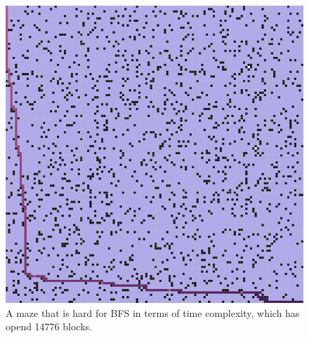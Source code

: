 \documentclass[letter]{article}
\begin{document}
\begin{enumerate}[resume]
\begin{enumerate}
\begin{enumerate}
\begin{figure}
					\includegraphics[width=\textwidth]{../pics/bb/14776.png}
					\caption{\label{fig:bb1}A maze that is hard for BFS in terms of time complexity, which has opend 14776 blocks.}
					

\end{figure}
\end{enumerate}
\end{enumerate}
\end{enumerate}
\end{document}
